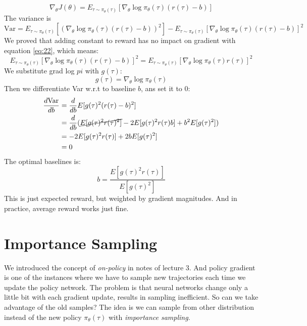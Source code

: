 \documentclass{tufte-handout}
\begin{document}
\begin{equation}
\label{eq:23}
\nabla _\theta J(\theta) = E_{\tau \sim \pi_\theta (\tau)} [\nabla_\theta \log \pi_\theta(\tau) (r(\tau) - b)]
\end{equation}
The variance is
\begin{equation}
\label{eq:24}
\text{Var} =
E_{\tau \sim \pi_\theta (\tau)} [(\nabla_\theta \log \pi_\theta(\tau) (r(\tau) - b)) ^ 2] -
E_{\tau \sim \pi_\theta (\tau)} [\nabla_\theta \log \pi_\theta(\tau) (r(\tau) - b)] ^ 2
\end{equation}
We proved that adding constant to reward has no impact on gradient with equation \ref{eq:22}, which means:
\begin{equation}
\label{eq:25}
E_{\tau \sim \pi_\theta (\tau)} [\nabla_\theta \log \pi_\theta(\tau) (r(\tau) - b)] ^ 2 =
E_{\tau \sim \pi_\theta (\tau)} [\nabla_\theta \log \pi_\theta(\tau) r(\tau) ] ^ 2
\end{equation}
We substitute grad log $pi$ with $g(\tau)$:
\[
g(\tau) = \nabla_\theta \log \pi_\theta(\tau)
\]
Then we differentiate Var w.r.t to baseline $b$, ans set it to 0:
\begin{align}
\label{eq:26}
\frac{d \text{Var}}{db} & = \frac{d}{db} E[g(\tau) ^ 2 (r(\tau) - b) ^2] \notag \\
& = \frac{d}{db} (\cancel{E[g(\tau)^2 r(\tau)^2]} - 2E[g(\tau)^2 r(\tau) b] + b^2 E[g(\tau) ^ 2]) \notag \\
& = -2 E[g(\tau) ^ 2 r(\tau)] + 2b E[g(\tau) ^ 2] \notag \\
& = 0
\end{align}
The optimal baselines is:
\begin{equation}
\label{eq:27}
b = \frac{E[g(\tau) ^2 r(\tau)]}{E[g(\tau) ^ 2]}
\end{equation}
This is just expected reward, but weighted by gradient magnitudes. And in practice, average reward works just fine.

\section{Importance Sampling}
We introduced the concept of \emph{on-policy} in notes of lecture 3. And policy gradient is one of the instances where we have to sample new trajectories each time we update the policy network. The problem is that neural networks change only a little bit with each gradient update, results in sampling inefficient. So can we take advantage of the old samples? The idea is we can sample from other distribution instead of the new policy $\pi_\theta(\tau)$ with \emph{importance sampling}.
\end{document}
